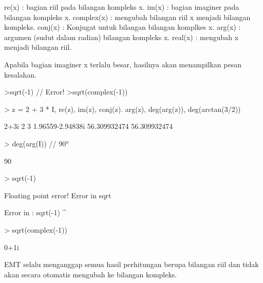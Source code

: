 \documentclass{report}
\begin{document}
\begin{eulernotebook}
\begin{eulercomment}
\begin{eulercomment}
\begin{eulercomment}
\end{eulercomment}
\begin{eulerttcomment}
  re(x) : bagian riil pada bilangan kompleks x.
  im(x) : bagian imaginer pada bilangan kompleks x.
  complex(x) : mengubah bilangan riil x menjadi bilangan kompleks.
  conj(x) : Konjugat untuk bilangan bilangan komplkes x.
  arg(x) : argumen (sudut dalam radian) bilangan kompleks x.
  real(x) : mengubah x menjadi bilangan riil.
\end{eulerttcomment}
\begin{eulercomment}

Apabila bagian imaginer x terlalu besar, hasilnya akan menampilkan
pesan kesalahan.

\end{eulercomment}
\begin{eulerttcomment}
  >sqrt(-1) // Error!
  >sqrt(complex(-1))
\end{eulerttcomment}
\begin{eulerprompt}
> z = 2 + 3 * I, re(z), im(z), conj(z). arg(z), deg(arg(z)), deg(arctan(3/2))
\end{eulerprompt}
\begin{euleroutput}
  2+3i
  2
  3
  1.96559-2.94838i
  56.309932474
  56.309932474
\end{euleroutput}
\begin{eulerprompt}
> deg(arg(I)) // 90°
\end{eulerprompt}
\begin{euleroutput}
  90
\end{euleroutput}
\begin{eulerprompt}
> sqrt(-1)
\end{eulerprompt}
\begin{euleroutput}
  Floating point error!
  Error in sqrt
  
  Error in :
   sqrt(-1)
           ^
\end{euleroutput}
\begin{eulerprompt}
> sqrt(complex(-1))
\end{eulerprompt}
\begin{euleroutput}
  0+1i
\end{euleroutput}
\begin{eulercomment}
EMT selalu menganggap semua hasil perhitungan berupa bilangan riil dan
tidak akan secara otomatis mengubah ke bilangan kompleks.


\end{eulercomment}
\end{eulercomment}
\end{eulercomment}
\end{eulernotebook}
\end{document}
